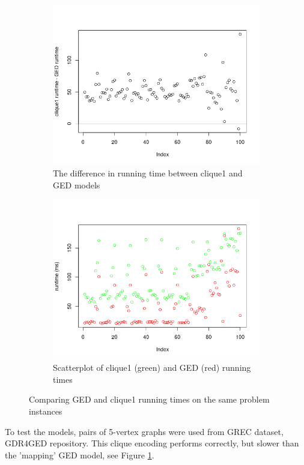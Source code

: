 \documentclass{article}
\theoremstyle{definition}
\begin{document}
\begin{figure}
  \begin{subfigure}{.5\textwidth}
    \includegraphics[scale=0.5]{comparison1.png}
    \caption{The difference in running time between clique1 and GED models}
  \end{subfigure}
  \begin{subfigure}{.5\textwidth}
    \includegraphics[scale=0.5]{comparison2.png}
    \caption{Scatterplot of clique1 (green) and GED (red) running times}
  \end{subfigure}
  \caption{Comparing GED and clique1 running times on the same problem instances}
  \label{fig:comparison}
\end{figure}
To test the models, pairs of 5-vertex graphs were used from GREC dataset, GDR4GED repository. This clique encoding performs correctly, but slower than the 'mapping' GED model, see Figure \ref{fig:comparison}.
\end{document}
